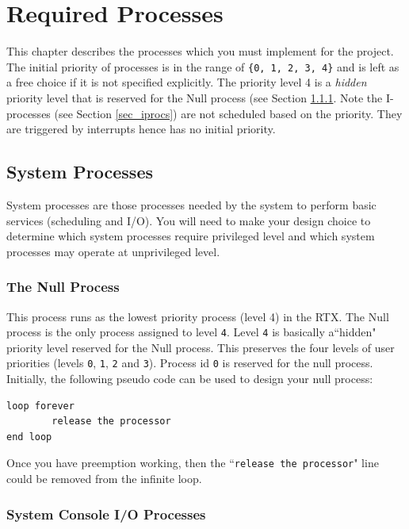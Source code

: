 \chapter{Required Processes}
\label{p01_ch_rtx_procs}
This chapter describes the processes which you must implement for the project. The initial priority of processes is in the range of \verb+{0, 1, 2, 3, 4}+ and is left as a free choice if it is not specified explicitly. The priority level 4 is a {\em hidden} priority level that is reserved for the Null process (see Section \ref{subsec_null_proc}. Note the I-processes (see Section \ref{sec_iprocs}) are not scheduled based on the priority. They are triggered by interrupts hence has no initial priority. 

\section{System Processes}
\label{sec_sys_procs}
System processes are those processes needed by the system to perform basic services (scheduling and I/O). You will need to make your design choice to determine which system processes require privileged level and which system processes may operate at unprivileged level.

\subsection{The Null Process}
\label{subsec_null_proc}

This process runs as the lowest priority process (level 4) in the RTX. The Null process is the only process assigned to level \verb+4+. Level \verb+4+ is basically a``hidden" priority level reserved for the Null process. This preserves the four levels of user priorities (levels \verb+0+, \verb+1+, \verb+2+ and \verb+3+). Process id \verb+0+ is reserved for the null process. Initially, the following pseudo code can be used to design your null process: \\
\begin{lstlisting}
loop forever
        release the processor
end loop
\end{lstlisting}
Once you have preemption working, then the ``\verb+release the processor+" line could be removed from the infinite loop.

\subsection{System Console I/O Processes}
\label{subsec_io_procs}

